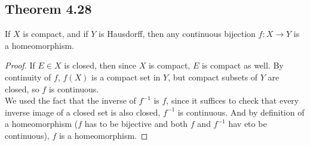 \documentclass[../../main.tex]{subfiles}
\begin{document}
\subsection{Theorem 4.28}
\begin{wts}
If $X$ is compact, and if $Y$ is Hausdorff, then any continuous bijection $f:X\to Y$ is a homeomorphism.
\end{wts}
\begin{proof}
If $E\in X$ is closed, then since $X$ is compact, $E$ is compact as well. By continuity of $f$, $f(X)$ is a compact set in $Y$, but compact subsets of $Y$ are closed, so $f$ is continuous.\\

We used the fact that the inverse of $f^{-1}$ is $f$, since it suffices to check that every inverse image of a closed set is also closed, $f^{-1}$ is continuous. And by definition of a homeomorphism ($f$ has to be bijective and both $f$ and $f^{-1}$ hav eto be continuous), $f$ is a homeomorphism.
\end{proof}
\end{document}
